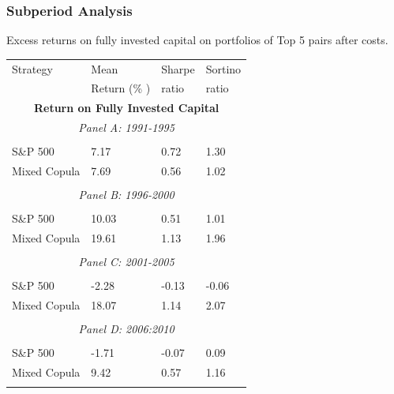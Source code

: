 \documentclass[pdf,10pt,xcolor=dvipsnames,hide notes]{beamer}
\begin{document}
\begin{frame}

\frametitle{Subperiod Analysis}

\begin{threeparttable}[H]
	\centering \tiny
	\caption{Excess returns on fully invested capital on portfolios of Top 5 pairs after costs. }
	\begin{tabularx}{\textwidth}{@{\extracolsep{\fill}}llll@{}}
		\toprule
		Strategy & Mean  & Sharpe & Sortino \\
		& Return (\% ) & ratio &  ratio     \\
		\midrule
		\multicolumn{4}{c}{\textbf{Return on Fully Invested Capital}} \\
		\multicolumn{4}{c}{\textit{Panel A: 1991-1995}} \\
		&       &       &       \\
		S\&P 500 & 7.17  & 0.72  & 1.30 \\
		Mixed Copula & 7.69  & 0.56  & 1.02 \\
		\multicolumn{1}{r}{} & \multicolumn{1}{r}{} & \multicolumn{1}{r}{} & \multicolumn{1}{r}{} \\
		\multicolumn{4}{c}{\textit{Panel B: 1996-2000}} \\
		&       &       &       \\
		S\&P 500 & 10.03  & 0.51  & 1.01 \\
		Mixed Copula & 19.61  & 1.13  & 1.96 \\
		\multicolumn{1}{r}{} & \multicolumn{1}{r}{} & \multicolumn{1}{r}{} & \multicolumn{1}{r}{} \\
		\multicolumn{4}{c}{\textit{Panel C: 2001-2005}} \\
		&       &       &       \\
		S\&P 500 & -2.28  & \cellcolor{Melon} -0.13  & -0.06 \\
		Mixed Copula & 18.07  & \cellcolor{corn} 1.14  & 2.07 \\
		\multicolumn{1}{r}{} & \multicolumn{1}{r}{} & \multicolumn{1}{r}{} & \multicolumn{1}{r}{} \\
		\multicolumn{4}{c}{\textit{Panel D: 2006:2010}} \\
		&       &       &       \\
		S\&P 500 & -1.71  & \cellcolor{Melon} -0.07  & 0.09 \\
		Mixed Copula & 9.42  & \cellcolor{corn} 0.57  & 1.16 \\
		\multicolumn{1}{r}{} & \multicolumn{1}{r}{} & \multicolumn{1}{r}{} & \multicolumn{1}{r}{} \\

\end{tabularx}
\end{threeparttable}
\end{frame}
\end{document}
